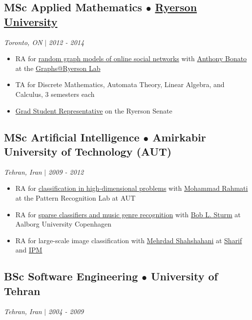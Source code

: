 \documentclass[11pt,letterpaper]{article}
\begin{document}
\subsection*{\textbf{MSc Applied Mathematics} $\bullet$ \href{https://www.torontomu.ca/graphs-group/join-us/}{Ryerson University}}
\textit{Toronto, ON} $|$ \textit{2012 - 2014}

\begin{itemize}
    \item RA for \href{https://djpardis.com/files/modeling_the_facebook_social_network.pdf}{random graph models of online social networks} with \href{https://math.ryerson.ca/~abonato/}{Anthony Bonato} at the \href{https://www.torontomu.ca/graphs-group/}{Graphs@Ryerson Lab}
    \item TA for Discrete Mathematics, Automata Theory, Linear Algebra, and Calculus, 3 semesters each
    \item \href{https://www.torontomu.ca/content/dam/senate/senate-meetings/agenda/2013/20130604agendamin.pdf}{Grad Student Representative} on the Ryerson Senate
\end{itemize}

\subsection*{\textbf{MSc Artificial Intelligence} $\bullet$ Amirkabir University of Technology (AUT)}
\textit{Tehran, Iran} $|$ \textit{2009 - 2012}

\begin{itemize}
    \item RA for \href{https://djpardis.com/files/Noorzad2012b.pdf}{classification in high-dimensional problems} with \href{https://scholar.google.com/citations?user=EYk7M80AAAAJ&hl=en}{Mohammad Rahmati} at the Pattern Recognition Lab at AUT
    \item RA for \href{https://djpardis.com/files/genreSturmNoorzad20120116.pdf}{sparse classifiers and music genre recognition} with \href{https://www.kth.se/profile/bobs}{Bob L. Sturm} at Aalborg University Copenhagen
    \item RA for large-scale image classification with \href{https://www.genealogy.math.ndsu.nodak.edu/id.php?id=32512}{Mehrdad Shahshahani} at \href{https://en.sharif.ir/}{Sharif} and \href{https://www.ipm.ac.ir/}{IPM}
\end{itemize}

\subsection*{\textbf{BSc Software Engineering} $\bullet$ University of Tehran}
\textit{Tehran, Iran} $|$ \textit{2004 - 2009}
\end{document}
